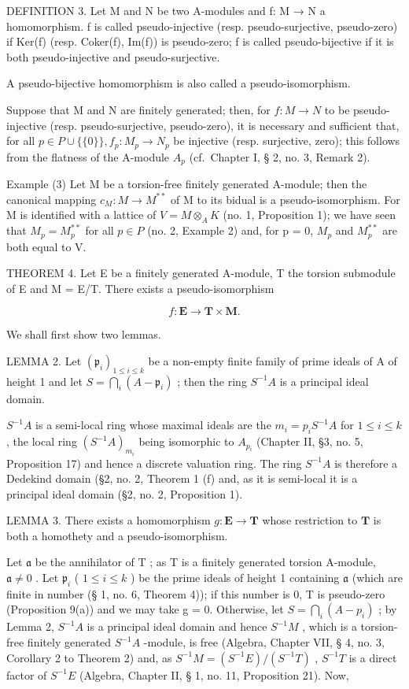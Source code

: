 DEFINITION 3. Let M and N be two A-modules and f: M → N a homomorphism. f is called pseudo-injective (resp. pseudo-surjective, pseudo-zero) if Ker(f) (resp. Coker(f), Im(f)) is pseudo-zero; f is called pseudo-bijective if it is both pseudo-injective and pseudo-surjective.

A pseudo-bijective homomorphism is also called a pseudo-isomorphism.

Suppose that M and N are finitely generated; then, for \(f: M \to N\) to be pseudo-injective (resp. pseudo-surjective, pseudo-zero), it is necessary and sufficient that, for all \(p \in P \cup \{\{0\}\}, f_{p}: M_{p} \to N_{p}\) be injective (resp. surjective, zero); this follows from the flatness of the A-module \(A_{p}\) (cf.~Chapter I, § 2, no. 3, Remark 2).

Example (3) Let M be a torsion-free finitely generated A-module; then the canonical mapping \(c_{M}: M \to M^{**}\) of M to its bidual is a pseudo-isomorphism. For M is identified with a lattice of \(V = M \otimes_{A} K\) (no. 1, Proposition 1); we have seen that \(M_{p} = M_{p}^{**}\) for all \(p \in P\) (no. 2, Example 2) and, for p = 0, \(M_{p}\) and \(M_{p}^{**}\) are both equal to V.

THEOREM 4. Let E be a finitely generated A-module, T the torsion submodule of E and M = E/T. There exists a pseudo-isomorphism

\[
f \colon \mathbf {E} \rightarrow \mathbf {T} \times \mathbf {M}.
\]

We shall first show two lemmas.

LEMMA 2. Let \((\mathfrak{p}_i)_{1 \leqslant i \leqslant k}\) be a non-empty finite family of prime ideals of A of height 1 and let \(S = \bigcap_{i} (A - \mathfrak{p}_i)\) ; then the ring \(S^{-1}A\) is a principal ideal domain.

\(S^{-1}A\) is a semi-local ring whose maximal ideals are the \(m_{i} = p_{i}S^{-1}A\) for \(1 \leqslant i \leqslant k\) , the local ring \((S^{-1}A)_{m_{i}}\) being isomorphic to \(A_{p_{i}}\) (Chapter II, §3, no. 5, Proposition 17) and hence a discrete valuation ring. The ring \(S^{-1}A\) is therefore a Dedekind domain (§2, no. 2, Theorem 1 (f) and, as it is semi-local it is a principal ideal domain (§2, no. 2, Proposition 1).

LEMMA 3. There exists a homomorphism \(g: \mathbf{E} \to \mathbf{T}\) whose restriction to \(\mathbf{T}\) is both a homothety and a pseudo-isomorphism.

Let \(\mathfrak{a}\) be the annihilator of \(\mathrm{T}\) ; as \(\mathrm{T}\) is a finitely generated torsion A-module, \(\mathfrak{a} \neq 0\) . Let \(\mathfrak{p}_i\) ( \(1 \leqslant i \leqslant k\) ) be the prime ideals of height 1 containing \(\mathfrak{a}\) (which are finite in number (§ 1, no. 6, Theorem 4)); if this number is 0, T is pseudo-zero (Proposition 9(a)) and we may take g = 0. Otherwise, let \(S = \bigcap_{i} (A - p_{i})\) ; by Lemma 2, \(S^{-1}A\) is a principal ideal domain and hence \(S^{-1}M\) , which is a torsion-free finitely generated \(S^{-1}A\) -module, is free (Algebra, Chapter VII, § 4, no. 3, Corollary 2 to Theorem 2) and, as \(S^{-1}M = (S^{-1}E)/(S^{-1}T)\) , \(S^{-1}T\) is a direct factor of \(S^{-1}E\) (Algebra, Chapter II, § 1, no. 11, Proposition 21). Now,

